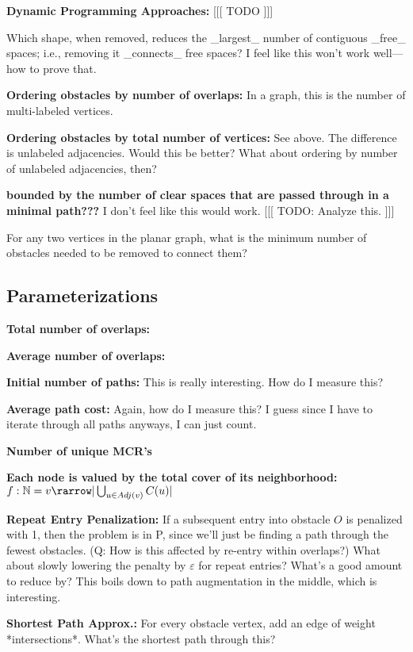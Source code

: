 \documentclass{amsart}
\begin{document}
{\textbf{Dynamic Programming Approaches:} [[[ TODO ]]]

Which shape, when removed, reduces the _largest_ number of contiguous _free_ spaces; i.e., removing it _connects_ free spaces? I feel like this won't work well---how to prove that.

\textbf{Ordering obstacles by number of overlaps:} In a graph, this is the number of multi-labeled vertices.

\textbf{Ordering obstacles by total number of vertices:} See above. The difference is unlabeled adjacencies. Would this be better? What about ordering by number of unlabeled adjacencies, then?

\textbf{bounded by the number of clear spaces that are passed through in a minimal path???} I don't feel like this would work. [[[ TODO: Analyze this. ]]]

For any two vertices in the planar graph, what is the minimum number of obstacles needed to be removed to connect them?

\subsection{Parameterizations}

\textbf{Total number of overlaps:}

\textbf{Average number of overlaps:}

\textbf{Initial number of paths:} This is really interesting. How do I measure this?

\textbf{Average path cost:} Again, how do I measure this? I guess since I have to iterate through all paths anyways, I can just count.

\textbf{Number of unique MCR's}

\textbf{Each node is valued by the total cover of its neighborhood:} $f: \mathbb{N} = v \rarrow |\bigcup_{u \in Adj(v)} C(u) |$

\textbf{Repeat Entry Penalization:} If a subsequent entry into obstacle $O$ is penalized with 1, then the problem is in P, since we'll just be finding a path through the fewest obstacles. (Q: How is this affected by re-entry within overlaps?) What about slowly lowering the penalty by $\varepsilon$ for repeat entries? What's a good amount to reduce by? This boils down to path augmentation in the middle, which is interesting.

\textbf{Shortest Path Approx.:} For every obstacle vertex, add an edge of weight *intersections*. What's the shortest path through this?

}
\end{document}
